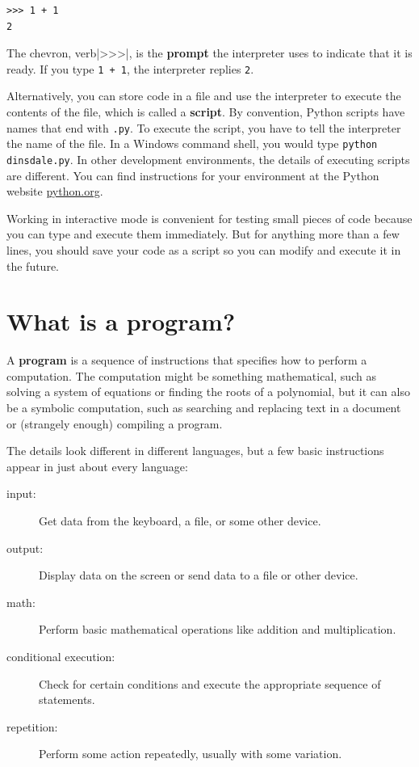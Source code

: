 
\beforeverb
\begin{verbatim}
>>> 1 + 1
2
\end{verbatim}
\afterverb
%
The chevron, verb|>>>|, is the
{\bf prompt} the interpreter uses to indicate that it is ready.  If
you type {\tt 1 + 1}, the interpreter replies {\tt 2}.


Alternatively, you can store code in a file and use the interpreter to
execute the contents of the file, which is called a {\bf script}.  By
convention, Python scripts have names that end with {\tt .py}.
To execute the script, you have to tell the interpreter the name of
the file. In a Windows command shell, you would type {\tt python
	dinsdale.py}.  In other development environments, the details of
executing scripts are different.  You can find instructions for
your environment at the Python website \url{python.org}.


Working in interactive mode is convenient for testing small pieces of
code because you can type and execute them immediately.  But for
anything more than a few lines, you should save your code
as a script so you can modify and execute it in the future.


\section{What is a program?}

A {\bf program} is a sequence of instructions that specifies how to
perform a computation.  The computation might be something
mathematical, such as solving a system of equations or finding the
roots of a polynomial, but it can also be a symbolic computation, such
as searching and replacing text in a document or (strangely enough)
compiling a program.


The details look different in different languages, but a few basic
instructions appear in just about every language:

\begin{description}
	
	\item[input:] Get data from the keyboard, a file, or some
	other device.
	
	\item[output:] Display data on the screen or send data to a
	file or other device.
	
	\item[math:] Perform basic mathematical operations like addition and
	multiplication.
	
	\item[conditional execution:] Check for certain conditions and
	execute the appropriate sequence of statements.
	
	\item[repetition:] Perform some action repeatedly, usually with
	some variation.
	
\end{description}

